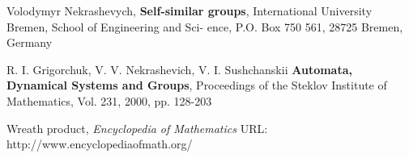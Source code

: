 \documentclass[mat1]{fmfdeloTS}
\begin{document}




\cite[p.~8-32]{Grigor}
\bigskip
\bigskip
\bigskip
\bigskip
\begin{thebibliography}{99}

Volodymyr Nekrashevych, \textbf{Self-similar groups}, International University Bremen, School of Engineering and Sci-
ence, P.O. Box 750 561, 28725 Bremen, Germany

R. I. Grigorchuk, V. V. Nekrashevich, V. I. Sushchanskii \textbf{Automata, Dynamical Systems and Groups}, Proceedings of the Steklov Institute of Mathematics, Vol. 231, 2000, pp. 128-203

Wreath product, \textit{Encyclopedia of Mathematics} URL: http://www.encyclopediaofmath.org/

\end{thebibliography}
\end{document}
